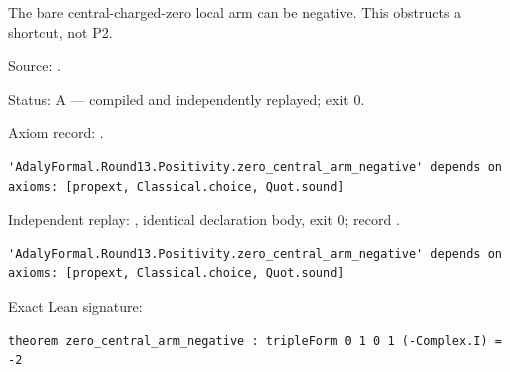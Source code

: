 \begin{theorem}[bp-461]
\label{bp-461}
\uses{}
\leanok
The bare central-charged-zero local arm can be negative. This obstructs a shortcut, not P2.

\par Source: \texttt{}.
\par Status: A — compiled and independently replayed; exit 0.
\par Axiom record: \texttt{}.
\begin{verbatim}
'AdalyFormal.Round13.Positivity.zero_central_arm_negative' depends on axioms: [propext, Classical.choice, Quot.sound]
\end{verbatim}
\par Independent replay: \texttt{}, identical declaration body, exit 0; record \texttt{}.
\begin{verbatim}
'AdalyFormal.Round13.Positivity.zero_central_arm_negative' depends on axioms: [propext, Classical.choice, Quot.sound]
\end{verbatim}
\par Exact Lean signature:
\begin{verbatim}
theorem zero_central_arm_negative : tripleForm 0 1 0 1 (-Complex.I) = -2
\end{verbatim}
\end{theorem}


